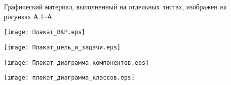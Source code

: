 
Графический материал, выполненный на отдельных листах,
изображен на рисунках А.1--А..
\setcounter{числоПлакатов}{0}

\renewcommand{\thefigure}{А.\arabic{figure}} %

\begin{landscape}

\begin{плакат}
    \texttt{[image: Плакат\_ВКР.eps]}
    \label{pl1:image}      
\end{плакат}

\begin{плакат}
    \texttt{[image: Плакат\_цель\_и\_задачи.eps]}
    \label{pl2:image}      
\end{плакат}

\begin{плакат}
    \texttt{[image: Плакат\_диаграмма\_компонентов.eps]}
    \label{pl3:image}      
\end{плакат}

\begin{плакат}
    \texttt{[image: плакат\_диаграмма\_классов.eps]}
    \label{pl4:image}      
\end{плакат}

\end{landscape}

